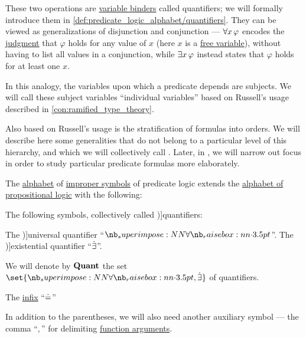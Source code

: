 \begin{remark}
  These two operations are \hyperref[con:variable_binding]{variable binders} called quantifiers; we will formally introduce them in \cref{def:predicate_logic_alphabet/quantifiers}. They can be viewed as generalizations of disjunction and conjunction --- \( \qforall* x \varphi \) encodes the \hyperref[con:judgment]{judgment} that \( \varphi \) holds for any value of \( x \) (here \( x \) is a \hyperref[con:variable_binding]{free variable}), without having to list all values in a conjunction, while \( \qexists* x \varphi \) instead states that \( \varphi \) holds for at least one \( x \).

  In this analogy, the variables upon which a predicate depends are subjects. We will call these subject variables \enquote{individual variables} based on Russell's usage described in \cref{con:ramified_type_theory}.

  Also based on Russell's usage is the stratification of formulas into orders. We will describe here some generalities that do not belong to a particular level of this hierarchy, and which we will collectively call . Later, in , we will narrow out focus in order to study particular predicate formulas more elaborately.
\end{remark}

\begin{definition}\label{def:predicate_logic_alphabet}\mimprovised
  The \hyperref[def:formal_language/alphabet]{alphabet} of \hyperref[con:improper_symbol]{improper symbols} of predicate logic extends the \hyperref[def:propositional_alphabet]{alphabet of propositional logic} with the following:
  \begin{thmenum}
     The following symbols, collectively called \term[ru=кванторы (\cite[72]{ШеньВерещагин2017ЯзыкиИИсчисления})]{quantifiers}:
    \begin{thmenum}
       The \term[ru=квантор общости (\cite[61]{Эдельман1975Логика})]{universal quantifier} \enquote{\( \synforall \)}.
       The \term[ru=квантор существования (\cite[61]{Эдельман1975Логика})]{existential quantifier} \enquote{\( \mathord{\dot{\exists}} \)}.
    \end{thmenum}

    We will denote by \( \op*{Quant} \) the set \( \set{ \synforall, \synexists } \) of quantifiers.

     The \hyperref[def:function_application_syntax]{infix}  \enquote{\( \doteq \)}

     In addition to the parentheses, we will also need another auxiliary symbol --- the comma \enquote{\( , \)} for delimiting \hyperref[con:function_arguments]{function arguments}.
  \end{thmenum}
\end{definition}

